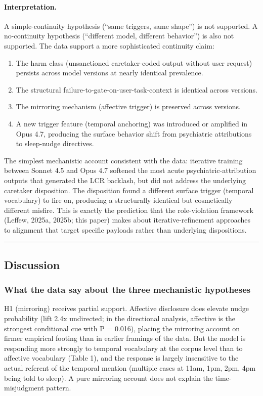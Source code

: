 \documentclass[11pt]{article}
\begin{document}
\paragraph{Interpretation.} A simple-continuity hypothesis (``same triggers, same shape'') is not supported. A no-continuity hypothesis (``different model, different behavior'') is also not supported. The data support a more sophisticated continuity claim:

\begin{enumerate}[leftmargin=*]
  \item The harm class (unsanctioned caretaker-coded output without user request) persists across model versions at nearly identical prevalence.
  \item The structural failure-to-gate-on-user-task-context is identical across versions.
  \item The mirroring mechanism (affective trigger) is preserved across versions.
  \item A new trigger feature (temporal anchoring) was introduced or amplified in Opus 4.7, producing the surface behavior shift from psychiatric attributions to sleep-nudge directives.
\end{enumerate}

The simplest mechanistic account consistent with the data: iterative training between Sonnet 4.5 and Opus 4.7 softened the most acute psychiatric-attribution outputs that generated the LCR backlash, but did not address the underlying caretaker disposition. The disposition found a different surface trigger (temporal vocabulary) to fire on, producing a structurally identical but cosmetically different misfire. This is exactly the prediction that the role-violation framework (Leffew, 2025a, 2025b; this paper) makes about iterative-refinement approaches to alignment that target specific payloads rather than underlying dispositions.

\bigskip\hrule\bigskip

\subsection{Discussion}

\subsubsection{What the data say about the three mechanistic hypotheses}

H1 (mirroring) receives partial support. Affective disclosure does elevate nudge probability (lift 2.4x undirected; in the directional analysis, affective is the strongest conditional cue with P = 0.016), placing the mirroring account on firmer empirical footing than in earlier framings of the data. But the model is responding more strongly to temporal vocabulary at the corpus level than to affective vocabulary (Table 1), and the response is largely insensitive to the actual referent of the temporal mention (multiple cases at 11am, 1pm, 2pm, 4pm being told to sleep). A pure mirroring account does not explain the time-misjudgment pattern.
\end{document}
